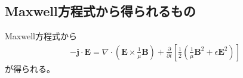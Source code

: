 \documentclass[12pt,dvipdfmx]{jsarticle}
\begin{document}
\subsection*{\large{Maxwell方程式から得られるもの}}
Maxwell方程式から
\begin{eqnarray}
  -\bm{j}\cdot\bm{E} = \nabla\cdot\left(\bm{E}\times\frac{1}{\mu}\bm{B}\right) + \frac{\partial}{\partial t}\left[ \frac{1}{2}\left(\frac{1}{\mu}\bm{B}^2 + \epsilon\bm{E}^2\right) \right]
\end{eqnarray}
が得られる。
\end{document}
